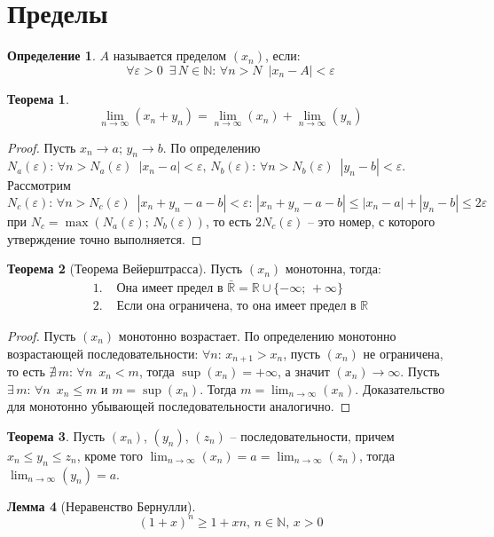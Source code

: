 \documentclass[12pt]{article}
\theoremstyle{definition}
\newtheorem{theorem}{Теорема}[section]
\newtheorem{lemma}[theorem]{Лемма}
\newtheorem{definition}{Определение}
\newcommand{\N}{\mathbb{N}}
\newcommand{\R}{\mathbb{R}}
\begin{document}
\section{Пределы}
\begin{definition}
    $A$ называется пределом $(x_n)$, если:
    $$\forall \varepsilon >0\,\,\,\exists\,N\in\N:\,\forall n>N\,\,\,|x_n-A|<\varepsilon$$
\end{definition}
\begin{theorem}
    $$\lim_{n\to\infty}(x_n+y_n)=\lim_{n\to\infty}(x_n)+\lim_{n\to\infty}(y_n)$$
\end{theorem}
\begin{proof}
    Пусть $x_n\to a;\,y_n\to b$. По определению $N_a(\varepsilon):\,\forall n>N_a(\varepsilon)\,\,\,|x_n-a|<\varepsilon,\,N_b(\varepsilon):\,\forall n>N_b(\varepsilon)\,\,\,|y_n-b|<\varepsilon$. Рассмотрим $N_c(\varepsilon):\,\forall n>N_c(\varepsilon)\,\,\,|x_n+y_n-a-b|<\varepsilon:\,|x_n+y_n-a-b|\leq|x_n-a|+|y_n-b|\leq 2\varepsilon$ при $N_c=\max(N_a(\varepsilon);\,N_b(\varepsilon))$, то есть $2N_c(\varepsilon)$ -- это номер, с которого утверждение точно выполняется.
\end{proof}
\begin{theorem}[Теорема Вейерштрасса]
    Пусть $(x_n)$ монотонна, тогда:
    \begin{align*}
        1.\,\,&\text{Она имеет предел в }\bar{\R}=\R\cup\{-\infty;\,+\infty\}\\
        2.\,\,&\text{Если она ограничена, то она имеет предел в }\R
    \end{align*}
\end{theorem}
\begin{proof}
    Пусть $(x_n)$ монотонно возрастает. По определению монотонно возрастающей последовательности: $\forall n:\, x_{n+1}>x_n$, пусть $(x_n)$ не ограничена, то есть $\nexists\,m:\,\forall n\,\,\,x_n<m$, тогда $\sup(x_n)=+\infty$, а значит $(x_n)\to \infty$. Пусть $\exists\,m:\,\forall n \,\,\,x_n\leq m$ и $m=\sup(x_n)$. Тогда $m=\lim_{n\to\infty}(x_n)$. Доказательство для монотонно убывающей последовательности аналогично.
\end{proof}
\begin{theorem}
    Пусть $(x_n)$, $(y_n)$, $(z_n)$ -- последовательности, причем $x_n\leq y_n\leq z_n$, кроме того $\lim_{n\to\infty}(x_n)=a=\lim_{n\to\infty}(z_n)$, тогда $\lim_{n\to\infty}(y_n)=a$.
\end{theorem}
\begin{lemma}[Неравенство Бернулли]
    $$(1+x)^n\geq 1+xn,\,n\in \N,\,x>0$$
\end{lemma}
\end{document}
